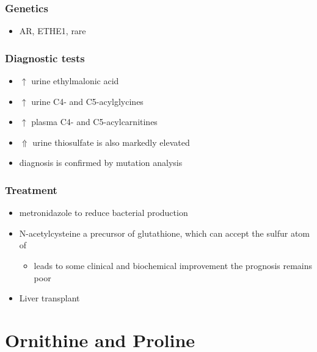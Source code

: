 \documentclass{scrartcl}
\begin{document}
\subsubsection{Genetics}
\label{sec:orgeab7d9a}
\begin{itemize}
\item AR, ETHE1, rare
\end{itemize}

\subsubsection{Diagnostic tests}
\label{sec:org25fe210}
\begin{itemize}
\item \(\uparrow\) urine ethylmalonic acid
\item \(\uparrow\) urine C4- and C5-acylglycines
\item \(\uparrow\) plasma C4- and C5-acylcarnitines
\item \(\Uparrow\) urine thiosulfate is also markedly elevated
\item diagnosis is confirmed by mutation analysis
\end{itemize}

\subsubsection{Treatment}
\label{sec:org130a5a0}
\begin{itemize}
\item metronidazole to reduce bacterial  production
\item N-acetylcysteine a precursor of glutathione, which can accept the sulfur atom of 
\begin{itemize}
\item leads to some clinical and biochemical improvement the prognosis remains poor
\end{itemize}
\item Liver transplant
\end{itemize}


\section{Ornithine and Proline}
\label{sec:org9072b85}
\end{document}
